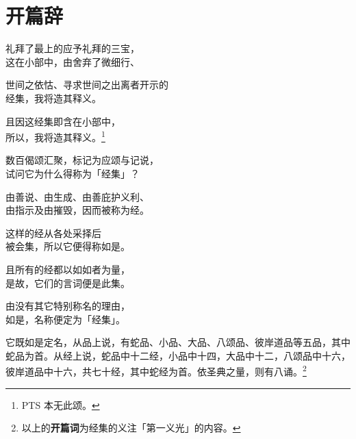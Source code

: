 \section{开篇辞}

\vspace{\fill}

\begin{quoting}礼拜了最上的应予礼拜的三宝，\\这在小部中，由舍弃了微细行、\end{quoting}

\begin{quoting}世间之依怙、寻求世间之出离者开示的\\经集，我将造其释义。\end{quoting}

\begin{quoting}且因这经集即含在小部中，\\所以，我将造其释义。\footnote{PTS 本无此颂。}\end{quoting}

\begin{quoting}数百偈颂汇聚，标记为应颂与记说，\\试问它为什么得称为「经集」？\end{quoting}

\begin{quoting}由善说、由生成、由善庇护义利、\\由指示及由摧毁，因而被称为经。\end{quoting}

\begin{quoting}这样的经从各处采择后\\被会集，所以它便得称如是。\end{quoting}

\begin{quoting}且所有的经都以如如者为量，\\是故，它们的言词便是此集。\end{quoting}

\begin{quoting}由没有其它特别称名的理由，\\如是，名称便定为「经集」。\end{quoting}

它既如是定名，从品上说，有蛇品、小品、大品、八颂品、彼岸道品等五品，其中蛇品为首。从经上说，蛇品中十二经，小品中十四，大品中十二，八颂品中十六，彼岸道品中十六，共七十经，其中蛇经为首。依圣典之量，则有八诵。\footnote{以上的\textbf{开篇词}为经集的义注「第一义光」的内容。}

\vspace{7em}